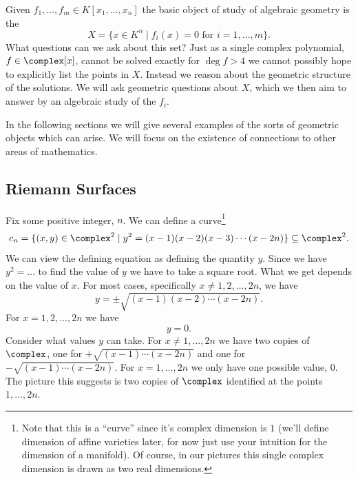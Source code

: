 \documentclass[fleqn]{NotesClass}
\begin{document}
    Given \(f_1, \dotsc, f_m \in K[x_1, \dotsc, x_n]\) the basic object of study of algebraic geometry is the 
    \begin{equation}
        X = \{x \in K^n \mid f_i(x) = 0 \text{ for } i = 1, \dotsc, m\}.
    \end{equation}
    What questions can we ask about this set?
    Just as a single complex polynomial, \(f \in \complex[x]\), cannot be solved exactly for \(\deg f > 4\) we cannot possibly hope to explicitly list the points in \(X\).
    Instead we reason about the geometric structure of the solutions.
    We will ask geometric questions about \(X\), which we then aim to answer by an algebraic study of the \(f_i\).
    
    In the following sections we will give several examples of the sorts of geometric objects which can arise.
    We will focus on the existence of connections to other areas of mathematics.
    
    \subsection{Riemann Surfaces}
    Fix some positive integer, \(n\).
    We can define a curve\footnote{Note that this is a \enquote{curve} since it's complex dimension is \(1\) (we'll define dimension of affine varieties later, for now just use your intuition for the dimension of a manifold). Of course, in our pictures this single complex dimension is drawn as two real dimensions.}
    \begin{equation}
        c_n = \{(x, y) \in \complex^2 \mid y^2 = (x - 1)(x - 2)(x - 3) \dotsm (x - 2n)\} \subseteq \complex^2.
    \end{equation}
    We can view the defining equation as defining the quantity \(y\).
    Since we have \(y^2 = \dotso\) to find the value of \(y\) we have to take a square root.
    What we get depends on the value of \(x\).
    For most cases, specifically \(x \ne 1, 2, \dotsc, 2n\), we have
    \begin{equation}
        y = \pm \sqrt{(x - 1)(x - 2) \dotsm (x - 2n)}.
    \end{equation}
    For \(x = 1, 2, \dotsc, 2n\) we have
    \begin{equation}
        y = 0.
    \end{equation}
    Consider what values \(y\) can take.
    For \(x \ne 1, \dotsc, 2n\) we have two copies of \(\complex\), one for \(+ \sqrt{(x-1) \dotsm (x - 2n)}\) and one for \(-\sqrt{(x - 1) \dotsm (x - 2n)}\).
    For \(x = 1, \dotsc, 2n\) we only have one possible value, \(0\).
    The picture this suggests is two copies of \(\complex\) identified at the points \(1, \dotsc, 2n\).
    
\end{document}
